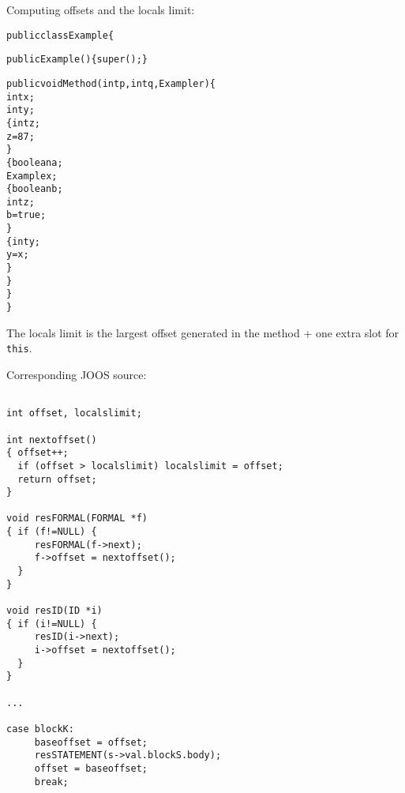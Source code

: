 \begin{slide*}
Computing offsets and the locals limit:

\newcommand{\os}[1]{ \hspace*{-0.4em}\raisebox{0.2em}{\fbox{$_{#1}$}}}
\begin{scriptsize}
\begin{alltt}
public class Example \{

  public Example() \{ super(); \}

  public void Method(int p\os{1}, int q\os{2}, Example r\os{3}) \{
     int x\os{4};
     int y\os{5};
     \{ int z\os{6};
       z = 87;
     \}
     \{ boolean a\os{6};
       Example x\os{7};
       \{ boolean b\os{8};
         int z\os{9};
         b = true;
       \}
       \{ int y\os{8};
         y = x;
       \}
     \}
  \}
\}
\end{alltt}
\end{scriptsize}

The locals limit is the largest offset generated in the method + one
extra slot for {\tt this}.
\vfil
\end{slide*}
 
\begin{slide*}
Corresponding JOOS source:

\begin{scriptsize}
\begin{verbatim}

int offset, localslimit;

int nextoffset()
{ offset++;
  if (offset > localslimit) localslimit = offset;
  return offset;
}

void resFORMAL(FORMAL *f)
{ if (f!=NULL) {
     resFORMAL(f->next);
     f->offset = nextoffset();
  }
}

void resID(ID *i)
{ if (i!=NULL) {
     resID(i->next);
     i->offset = nextoffset();
  }
}

...

case blockK:
     baseoffset = offset;
     resSTATEMENT(s->val.blockS.body);
     offset = baseoffset;
     break;
\end{verbatim}
\end{scriptsize}

\vfil
\end{slide*}
 
